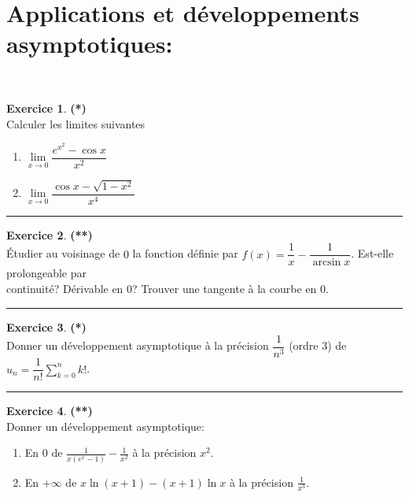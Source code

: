 \documentclass[a4paper,11pt]{article}
\theoremstyle{definition}
\newtheorem{exo}{Exercice} %
\begin{document}
\section*{Applications et développements asymptotiques:}\hfill\\%
\begin{minipage}{1\linewidth}
	\begin{minipage}[t]{0.48\linewidth}
		\raggedright
		
		
\begin{exo}\textbf{(*)}\quad\\[0.2cm]
	Calculer les limites suivantes
	\begin{multicols}{2}
		\begin{enumerate}
			\item $\lim\limits_{x\rightarrow 0}\dfrac{e^{x^2}-\cos x}{x^2}$
			\item $\lim\limits_{x\rightarrow 0}\dfrac{\cos x-\sqrt{1-x^2}}{x^4}$
		\end{enumerate}
	\end{multicols}
	
	\centering
	\rule{1\linewidth}{0.6pt}
\end{exo}

			\begin{exo}\textbf{(**)}\quad\\[0.2cm]
	Étudier au voisinage de $0$ la fonction définie par  $f(x)=\dfrac{1}{x}-\dfrac{1}{\arcsin x}$. Est-elle prolongeable par\\[0.2cm] continuité? Dérivable en $0$? Trouver une tangente à la courbe en 0. 
	
	\centering
	\rule{1\linewidth}{0.6pt}
\end{exo}
		

		
	\end{minipage}	
	\hfill\vrule\hfill
	\begin{minipage}[t]{0.48\linewidth}
		\raggedright
		
		
		\begin{exo}\textbf{(*)}\quad\\[0.2cm]
		Donner un développement asymptotique à la précision $\dfrac{1}{n^3}$ (ordre 3) de $u_n=\dfrac{1}{n!}\sum_{k=0}^{n}k!$.
			
			\centering
			\rule{1\linewidth}{0.6pt}
		\end{exo}
	
		\begin{exo}\textbf{(**)}\quad\\[0.2cm]
		Donner un développement asymptotique:
		\begin{enumerate}
			\item    En $0$ de $\frac{1}{x(e^x-1)}-\frac{1}{x^2}$ à la précision $x^2$.
			\item    En $+\infty$ de $x\ln(x+1)-(x+1)\ln x$ à la précision $\frac{1}{x^3}$.
		\end{enumerate}
		

\end{exo}
\end{minipage}
\end{minipage}
\end{document}

